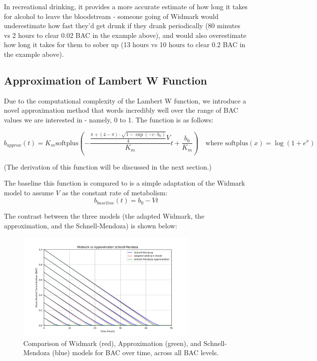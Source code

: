 \documentclass[12pt]{article}
\begin{document}
In recreational drinking, it provides a more accurate estimate of how long it takes for alcohol to leave the bloodstream - someone going of Widmark would underestimate how fast they'd get drunk if they drank periodically (80 minutes vs 2 hours to clear 0.02 BAC in the example above), and would also overestimate how long it takes for them to sober up (13 hours vs 10 hours to clear 0.2 BAC in the example above).

\subsection{Approximation of Lambert W Function}

Due to the computational complexity of the Lambert W function, we introduce a novel approximation method that words incredibly well over the range of BAC values we are interested in - namely, 0 to 1. The function is as follows:

\[
    b_{approx}(t) = K_m\mathrm{softplus}(-\frac{\frac{\pi + (4 - \pi) \cdot \sqrt{1 - \exp(-e \cdot b_0)}}{4}V}{K_m}t + \frac{b_0}{K_m}) \quad \text{where } \mathrm{softplus}(x) = \log(1 + e^x)
\]

(The derivation of this function will be discussed in the next section.)

The baseline this function is compared to is a simple adaptation of the Widmark model to assume $V$ as the constant rate of metabolism:
\[
    b_{baseline}(t) = b_0 - Vt
\]

The contrast between the three models (the adapted Widmark, the approximation, and the Schnell-Mendoza) is shown below:

\begin{figure}[H]
\centering
\includegraphics[width=0.8\textwidth]{widmark_vs_approximation.png}
\caption{Comparison of Widmark (red), Approximation (green), and Schnell-Mendoza (blue) models for BAC over time, across all BAC levels.}
\label{fig:comparison}
\end{figure}
\end{document}
